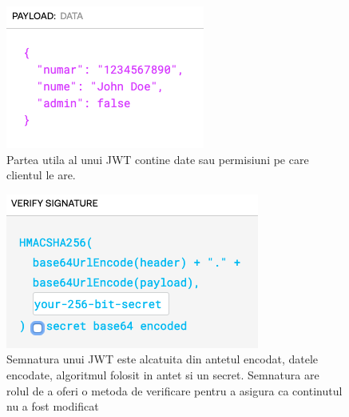 \documentclass[a4paper]{article}
\begin{document}
\begin{figure}[H]
    \begin{minipage}[c]{0.67\textwidth}
        \includegraphics[width=\textwidth]{jwt-payload.png}
    \end{minipage}\hfill
    \begin{minipage}[c]{0.3\textwidth}
        \caption{Partea utila al unui JWT contine date sau permisiuni
        pe care clientul le are.}
    \end{minipage}
\end{figure}

\begin{figure}[H]
    \begin{minipage}[c]{0.67\textwidth}
        \includegraphics[width=\textwidth]{jwt-sign.png}
    \end{minipage}\hfill
    \begin{minipage}[c]{0.3\textwidth}
        \caption{Semnatura unui JWT este alcatuita din antetul encodat, 
        datele encodate, algoritmul folosit in antet si un secret. Semnatura are rolul
        de a oferi o metoda de verificare pentru a asigura ca continutul nu a fost 
        modificat }
    \end{minipage}
\end{figure}
\end{document}
